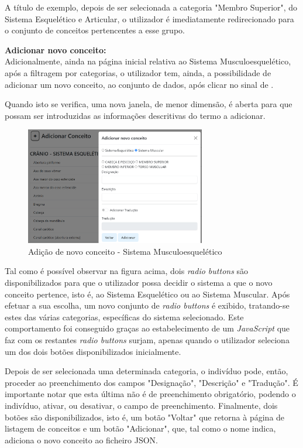 A título de exemplo, depois de ser selecionada a categoria "Membro Superior", do Sistema Esquelético e Articular, o utilizador é imediatamente redirecionado para o conjunto de conceitos pertencentes a esse grupo.

\textbf{Adicionar novo conceito:}\\

Adicionalmente, ainda na página inicial relativa ao Sistema Musculoesquelético, após a filtragem por categorias, o utilizador tem, ainda, a possibilidade de adicionar um novo conceito, ao conjunto de dados, após clicar no sinal de \+.

Quando isto se verifica, uma nova janela, de menor dimensão, é aberta para que possam ser introduzidas as informações descritivas do termo a adicionar.

\begin{figure}[H]
    \centering
    \centering
    \includegraphics[width=0.7\textwidth]{Images/musculo_adicionar.png}
    \caption{Adição de novo conceito - Sistema Musculoesquelético}
    \label{fig:dic-traduc1}
\end{figure}

Tal como é possível observar na figura acima, dois \textit{radio buttons} são disponibilizados para que o utilizador possa decidir o sistema a que o novo conceito pertence, isto é, ao Sistema Esquelético ou ao Sistema Muscular. Após efetuar a sua escolha, um novo conjunto de \textit{radio buttons} é exibido, tratando-se estes das várias categorias, específicas do sistema selecionado. Este comportamento foi conseguido graças ao estabelecimento de um \textit{JavaScript} que faz com os restantes \textit{radio buttons} surjam, apenas quando o utilizador seleciona um dos dois botões disponibilizados inicialmente.

Depois de ser selecionada uma determinada categoria, o indivíduo pode, então, proceder ao preenchimento dos campos "Designação", "Descrição" e "Tradução". É importante notar que esta última não é de preenchimento obrigatório, podendo o indivíduo, ativar, ou desativar, o campo de preenchimento.
Finalmente, dois botões são disponibilizados, isto é, um botão "Voltar" que retorna à página de listagem de conceitos e um botão "Adicionar", que, tal como o nome indica, adiciona o novo conceito ao ficheiro JSON.

